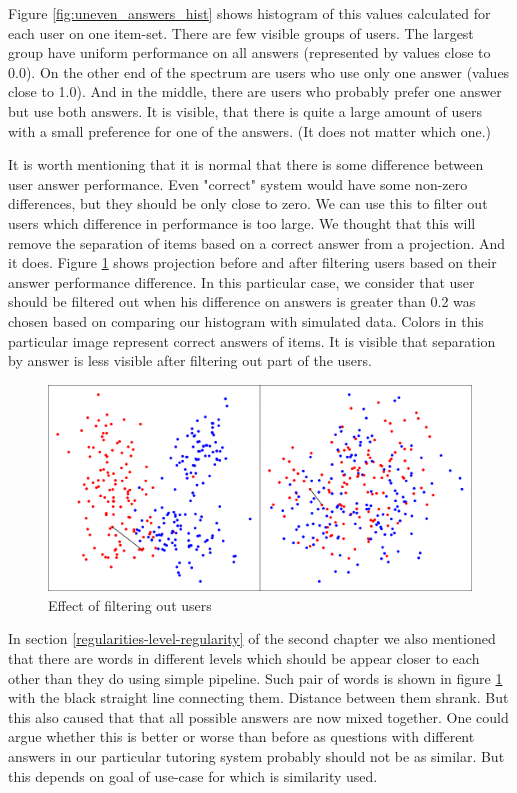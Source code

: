 \documentclass[
  digital, %
  table,   %
  nolof,     %
  nolot,     %
  nocover,
  color,
  final, %
]{fithesis3}
\begin{document}
Figure \ref{fig:uneven_answers_hist} shows histogram of this values calculated for each user on one item-set. There are few visible groups of users. The largest group have uniform performance on all answers (represented by values close to 0.0). On the other end of the spectrum are users who use only one answer (values close to 1.0). And in the middle, there are users who probably prefer one answer but use both answers. It is visible, that there is quite a large amount of users with a small preference for one of the answers. (It does not matter which one.)


It is worth mentioning that it is normal that there is some difference between user answer performance. Even "correct" system would have some non-zero differences, but they should be only close to zero. We can use this to filter out users which difference in performance is too large. We thought that this will remove the separation of items based on a correct answer from a projection. And it does. Figure \ref{fig:answers_normalization} shows projection before and after filtering users based on their answer performance difference. In this particular case, we consider that user should be filtered out when his difference on answers is greater than 0.2 was chosen based on comparing our histogram with simulated data. Colors in this particular image represent correct answers of items. It is visible that separation by answer is less visible after filtering out part of the users.

\begin{figure}
  \includegraphics[width=\textwidth]{img/answers_normalization}
  \caption{Effect of filtering out users}
  \label{fig:answers_normalization}
\end{figure}

In section \ref{regularities-level-regularity} of the second chapter we also mentioned that there are words in different levels which should be appear closer to each other than they do using simple pipeline. Such pair of words is shown in figure \ref{fig:answers_normalization} with the black straight line connecting them. Distance between them shrank. But this also caused that that all possible answers are now mixed together. One could argue whether this is better or worse than before as questions with different answers in our particular tutoring system probably should not be as similar. But this depends on goal of use-case for which is similarity used.
\end{document}
